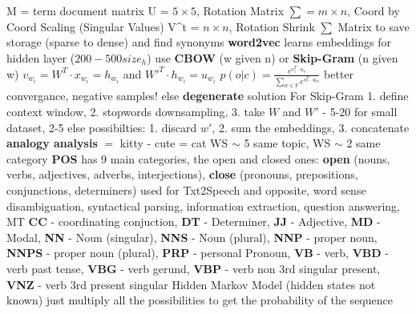 \documentclass[8pt]{extarticle}
\begin{document}
\begin{multicols*}{3}
\newline M =  term document matrix
\newline U = $5 \times 5$, Rotation Matrix
\newline $\sum = m \times n $, Coord by Coord Scaling (Singular Values)
\newline V^t = $ n \times n $, Rotation 
\newline Shrink $\sum$ Matrix to save storage (sparse to dense) and find synonyms
\newline \textbf{word2vec} learns embeddings for hidden layer ($200-500 size_h$)
\newline use \textbf{CBOW} (w given n) or \textbf{Skip-Gram} (n given w)
\newline $ v_w_i  = W^T \cdot x_w_i = h_w_i  $ and $W'^{T} \cdot h_w_i = u_w_i$
\newline $ p(o|c) = \frac{e^{v_c^T \cdot u_o}}{\sum_{w \in V} e^{v_c^T \cdot u_w}}$
\newline better convergance, negative samples! else \textbf{degenerate} solution
\newline For Skip-Gram 1. define context window, 2. stopwords downsampling, 3. take $W$ and $W'$ - 5-20 for small dataset, 2-5 else
 possibilties: 1. discard $w'$, 2. sum the embeddings, 3. concatenate
\newline \textbf{analogy analysis} $=$ kitty - cute = cat
\newline WS $\sim$ 5 same topic, WS $\sim$ 2 same category
\newpage
\textbf{POS} has 9 main categories, the open and closed ones: \textbf{open} (nouns, verbs, adjectives, adverbs, interjections), \textbf{close} (pronouns, prepositions, conjunctions, determiners)
\newline used for Txt2Speech and opposite, word sense disambiguation, syntactical parsing, information extraction, question answering, MT
\newline \textbf{CC} - coordinating conjuction, \textbf{DT} - Determiner, \textbf{JJ} - Adjective, \textbf{MD} - Modal, \textbf{NN} - Noun (singular), \textbf{NNS} - Noun (plural), \textbf{NNP} - proper noun, \textbf{NNPS} - proper noun (plural), \textbf{PRP} - personal Pronoun, \textbf{VB} - verb, \textbf{VBD} - verb past tense, \textbf{VBG} - verb gerund, \textbf{VBP} - verb non 3rd singular present, \textbf{VNZ} - verb 3rd present singular
\newline Hidden Markov Model (hidden states not known) 
\newline just multiply all the possibilities to get the probability of the sequence

\end{multicols*}
\end{document}
